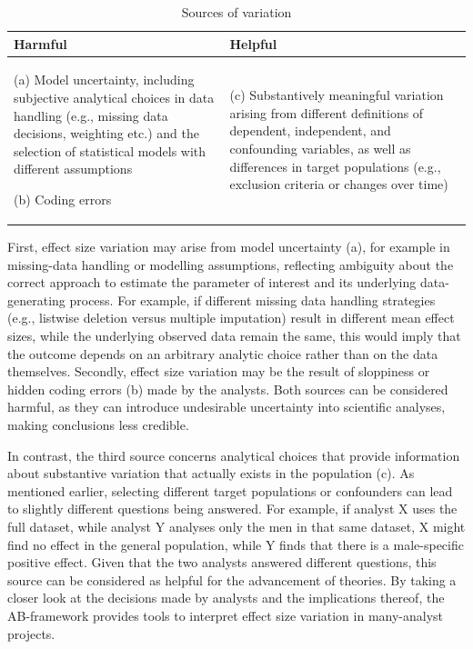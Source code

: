 \documentclass[
  letterpaper,
  DIV=11,
  numbers=noendperiod]{scrartcl}
\begin{document}
\begin{table}[H]
\centering
\caption{Sources of variation}
\label{tab:AB_framework}
\begin{threeparttable}
\footnotesize
\setlength{\tabcolsep}{10pt}
\renewcommand{\arraystretch}{1.2}

\begin{tabular}{
>{\RaggedRight\arraybackslash}p{7.2cm}
>{\RaggedRight\arraybackslash}p{7.2cm}
}
\toprule
\textbf{Harmful} & \textbf{Helpful} \\
\midrule

(a) Model uncertainty, including subjective analytical choices in data handling (e.g., missing data decisions, weighting etc.) and the selection of statistical models with different assumptions

\vspace{0.4em}
(b) Coding errors
&
(c) Substantively meaningful variation arising from different definitions of dependent, independent, and confounding variables, as well as differences in target populations (e.g., exclusion criteria or changes over time) \\

\bottomrule
\end{tabular}

\end{threeparttable}
\end{table}

First, effect size variation may arise from model uncertainty (a), for
example in missing-data handling or modelling assumptions, reflecting
ambiguity about the correct approach to estimate the parameter of
interest and its underlying data-generating process. For example, if
different missing data handling strategies (e.g., listwise deletion
versus multiple imputation) result in different mean effect sizes, while
the underlying observed data remain the same, this would imply that the
outcome depends on an arbitrary analytic choice rather than on the data
themselves. Secondly, effect size variation may be the result of
sloppiness or hidden coding errors (b) made by the analysts. Both
sources can be considered harmful, as they can introduce undesirable
uncertainty into scientific analyses, making conclusions less credible.

In contrast, the third source concerns analytical choices that provide
information about substantive variation that actually exists in the
population (c). As mentioned earlier, selecting different target
populations or confounders can lead to slightly different questions
being answered. For example, if analyst X uses the full dataset, while
analyst Y analyses only the men in that same dataset, X might find no
effect in the general population, while Y finds that there is a
male-specific positive effect. Given that the two analysts answered
different questions, this source can be considered as helpful for the
advancement of theories. By taking a closer look at the decisions made
by analysts and the implications thereof, the AB-framework provides
tools to interpret effect size variation in many-analyst projects.
\end{document}
